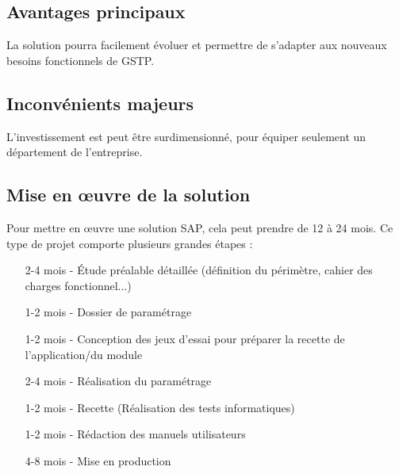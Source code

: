 \subsection{Avantages principaux}

La solution pourra facilement évoluer et permettre de s'adapter aux nouveaux besoins
fonctionnels de GSTP.

\subsection{Inconvénients majeurs}

L'investissement est peut être surdimensionné, pour équiper seulement un département
de l'entreprise.

\subsection{Mise en œuvre de la solution}
Pour mettre en œuvre une solution SAP, cela peut prendre de 12 à 24 mois.
Ce type de projet comporte plusieurs grandes étapes :

\begin{itemize}
	\item[2-4 mois -] Étude préalable détaillée (définition du périmètre, cahier des charges fonctionnel...)
	\item[1-2 mois -] Dossier de paramétrage
	\item[1-2 mois -] Conception des jeux d’essai pour préparer la recette de l'application/du module
	\item[2-4 mois -] Réalisation du paramétrage
	\item[1-2 mois -] Recette (Réalisation des tests informatiques)
	\item[1-2 mois -] Rédaction des manuels utilisateurs
	\item[4-8 mois -] Mise en production
\end{itemize}

